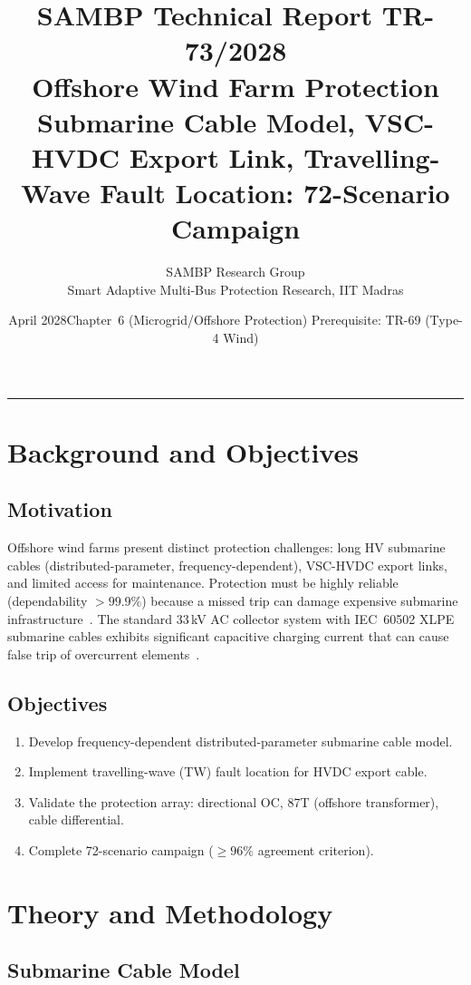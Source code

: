 \documentclass[11pt, a4paper]{article}
\title{\textbf{\textsf{\color{sambpblue}SAMBP Technical Report TR-73/2028}}\\[6pt]
  \Large Offshore Wind Farm Protection\\[4pt]
  \normalsize Submarine Cable Model, VSC-HVDC Export Link,
  Travelling-Wave Fault Location: 72-Scenario Campaign}
\author{SAMBP Research Group\\[2pt]
  \small Smart Adaptive Multi-Bus Protection Research, IIT Madras}
\date{April 2028\quad\textbar\quad Chapter~6 (Microgrid/Offshore Protection)\quad\textbar\quad
  Prerequisite: TR-69 (Type-4 Wind)}
\begin{document}
\maketitle
\tableofcontents
\vspace{6pt}\hrule\vspace{10pt}

\section{Background and Objectives}
\label{sec:background}

\subsection{Motivation}

Offshore wind farms present distinct protection challenges: long HV submarine
cables (distributed-parameter, frequency-dependent), VSC-HVDC export links,
and limited access for maintenance. Protection must be highly reliable
(dependability $> 99.9\%$) because a missed trip can damage expensive
submarine infrastructure~\cite{Hertem2016}. The standard 33\,kV AC collector
system with IEC~60502 XLPE submarine cables exhibits significant capacitive
charging current that can cause false trip of overcurrent elements~\cite{Brantmark1999}.

\subsection{Objectives}

\begin{enumerate}
  \item Develop frequency-dependent distributed-parameter submarine cable model.
  \item Implement travelling-wave (TW) fault location for HVDC export cable.
  \item Validate the protection array: directional OC, 87T (offshore transformer),
    cable differential.
  \item Complete 72-scenario campaign ($\geq 96\%$ agreement criterion).
\end{enumerate}

\section{Theory and Methodology}
\label{sec:theory}

\subsection{Submarine Cable Model}
\end{document}
